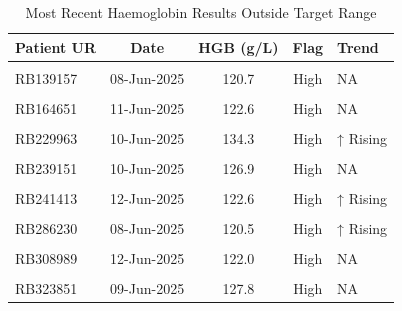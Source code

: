 \documentclass[
]{article}
\begin{document}
\begin{table}[!h]
\centering
\caption{\label{tab:plot_function_trend_tables}Most Recent Haemoglobin Results Outside Target Range}
\centering
\begin{tabular}[t]{lcccl}
\toprule
Patient UR & Date & HGB (g/L) & Flag & Trend\\
\midrule
\cellcolor{gray!10}{RB114617} & \cellcolor{gray!10}{08-Jun-2025} & \cellcolor{gray!10}{129.1} & \cellcolor{gray!10}{High} & \cellcolor{gray!10}{NA}\\
RB139157 & 08-Jun-2025 & 120.7 & High & NA\\
\cellcolor{gray!10}{RB143705} & \cellcolor{gray!10}{12-Jun-2025} & \cellcolor{gray!10}{122.2} & \cellcolor{gray!10}{High} & \cellcolor{gray!10}{NA}\\
RB164651 & 11-Jun-2025 & 122.6 & High & NA\\
\cellcolor{gray!10}{RB190135} & \cellcolor{gray!10}{13-Jun-2025} & \cellcolor{gray!10}{136.2} & \cellcolor{gray!10}{High} & \cellcolor{gray!10}{NA}\\
\addlinespace
RB229963 & 10-Jun-2025 & 134.3 & High & ↑ Rising\\
\cellcolor{gray!10}{RB237595} & \cellcolor{gray!10}{09-Jun-2025} & \cellcolor{gray!10}{124.8} & \cellcolor{gray!10}{High} & \cellcolor{gray!10}{↑ Rising}\\
RB239151 & 10-Jun-2025 & 126.9 & High & NA\\
\cellcolor{gray!10}{RB240331} & \cellcolor{gray!10}{10-Jun-2025} & \cellcolor{gray!10}{126.0} & \cellcolor{gray!10}{High} & \cellcolor{gray!10}{NA}\\
RB241413 & 12-Jun-2025 & 122.6 & High & ↑ Rising\\
\addlinespace
\cellcolor{gray!10}{RB266875} & \cellcolor{gray!10}{08-Jun-2025} & \cellcolor{gray!10}{131.2} & \cellcolor{gray!10}{High} & \cellcolor{gray!10}{↑ Rising}\\
RB286230 & 08-Jun-2025 & 120.5 & High & ↑ Rising\\
\cellcolor{gray!10}{RB303077} & \cellcolor{gray!10}{12-Jun-2025} & \cellcolor{gray!10}{130.7} & \cellcolor{gray!10}{High} & \cellcolor{gray!10}{NA}\\
RB308989 & 12-Jun-2025 & 122.0 & High & NA\\
\cellcolor{gray!10}{RB315176} & \cellcolor{gray!10}{12-Jun-2025} & \cellcolor{gray!10}{124.8} & \cellcolor{gray!10}{High} & \cellcolor{gray!10}{↑ Rising}\\
\addlinespace
RB323851 & 09-Jun-2025 & 127.8 & High & NA\\

\end{tabular}
\end{table}
\end{document}
